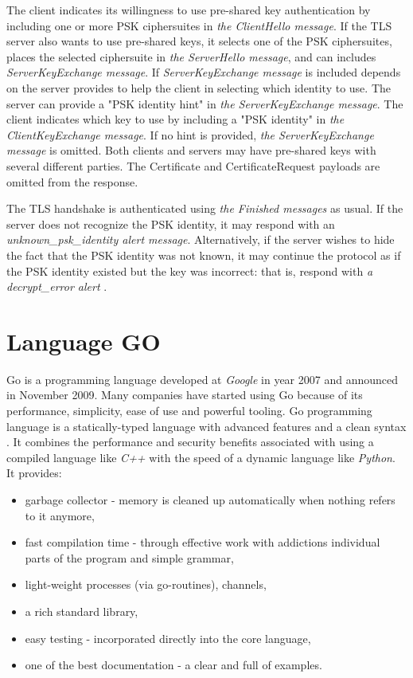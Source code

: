 \documentclass[
  digital, %
  notable,   %
  lof,     %
  lot,     %
]{fithesis3}
\begin{document}
The client indicates its willingness to use pre-shared key authentication by including one or 
more PSK ciphersuites in \textit{the ClientHello message}. If the TLS server also wants to use 
pre-shared keys, it selects one of the PSK ciphersuites, places the selected ciphersuite in 
\textit{the ServerHello message}, and can includes \textit{ServerKeyExchange message}. If 
\textit{ServerKeyExchange message} is included depends on the server provides to help the 
client in selecting which identity to use. The server can provide a "PSK identity hint" in 
\textit{the ServerKeyExchange message}. The client indicates which key to use by including a 
"PSK identity" in \textit{the ClientKeyExchange message}. If no hint is provided, \textit{the 
ServerKeyExchange message} is omitted. Both clients and servers may have pre-shared keys with 
several different parties. The Certificate and CertificateRequest payloads are omitted from 
the response.

The TLS handshake is authenticated using \textit{the Finished messages} as usual. If the 
server does not recognize the PSK identity, it may respond with an 
\textit{unknown\_psk\_identity alert message}.  Alternatively, if the server wishes to hide 
the fact that the PSK identity was not known, it may continue the protocol as if the PSK 
identity existed but the key was incorrect: that is, respond with \textit{a decrypt\_error 
alert} \cite{eronen2005pre}. 

\chapter{Language GO}
Go is a programming language developed at \textit{Google} in year 2007 and announced in 
November 2009. Many companies have started using Go because of its performance, simplicity, 
ease of use and powerful tooling. Go programming language is a statically-typed language with 
advanced features and a clean syntax \cite{doxsey2016introducing}. It combines the performance 
and security benefits associated with using a compiled language like \textit{C++} with the 
speed of a dynamic language like \textit{Python}. It provides:
\vskip0.1in
\begin{itemize}[leftmargin=2em,rightmargin=1em,itemsep=0.75\parskip,parsep=0em,topsep=0em,partopsep=0em]
\item garbage collector - memory is cleaned up automatically when nothing refers to it 
anymore,
\item fast compilation time - through effective work with addictions individual parts of the 
program and simple grammar,
\item light-weight processes (via go-routines), channels,
\item a rich standard library,
\item easy testing - incorporated directly into the core language,
\item one of the best documentation - a clear and full of examples.
\end{itemize}
\vskip0.1in
\end{document}
